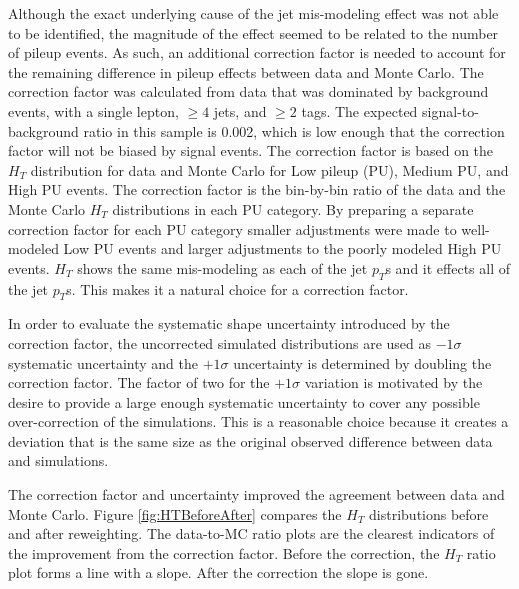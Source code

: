 \par Although the exact underlying cause of the jet mis-modeling
effect was not able to be identified, the magnitude of the effect
seemed to be related to the number of pileup events.  As such, an
additional correction factor is needed to account for the remaining
difference in pileup effects between data and Monte Carlo.  The 
correction factor was calculated from data that was dominated by
background events, with a single lepton, $\geq 4$ jets, and
$\geq 2$ tags. The expected signal-to-background ratio in this sample
is 0.002, which is low enough that the correction factor will not be
biased by signal events.  The correction factor is based on the $H_{T}$
distribution for data and Monte Carlo for Low pileup (PU), Medium PU,
and High PU events. The correction factor is the bin-by-bin ratio of
the data and the Monte Carlo $H_{T}$ distributions in each PU
category.  By preparing a separate correction factor for each PU
category smaller adjustments were made to well-modeled Low PU events and
larger adjustments to the poorly modeled High PU events.  $H_{T}$
shows the same mis-modeling as each of the jet $p_{T}$s and it
effects all of the jet $p_{T}$s. This makes it a natural choice for a
correction factor.

\par In order to evaluate the systematic shape uncertainty introduced
by the correction factor, the uncorrected simulated distributions are
used as $-1\sigma$ systematic uncertainty and the $+1\sigma$
uncertainty is determined by doubling the correction factor. The
factor of two for the $+1\sigma$ variation is motivated by the desire
to provide a large enough systematic uncertainty to cover any possible
over-correction of the simulations.  This is a reasonable choice
because it creates a deviation that is the same size as the original
observed difference between data and simulations. 

\par The correction factor and uncertainty improved the agreement
between data and Monte Carlo. Figure \ref{fig:HTBeforeAfter}
compares the $H_{T}$ distributions before and after
reweighting. The data-to-MC ratio plots are the clearest indicators of
the improvement from the correction factor. Before the correction,
the $H_{T}$ ratio plot forms a line with a slope. After the correction
the slope is gone.

